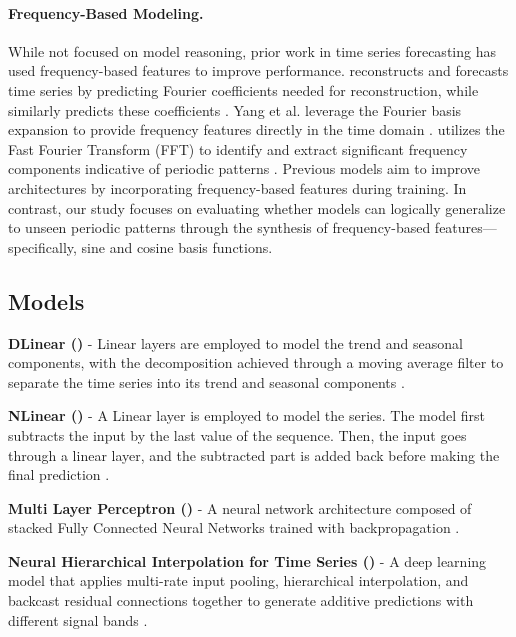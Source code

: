 \paragraph{Frequency-Based Modeling.} While not focused on model reasoning, prior work in time series forecasting has used frequency-based features to improve performance. \NBEATS reconstructs and forecasts time series by predicting Fourier coefficients needed for reconstruction, while \BasisFormer similarly predicts these coefficients \citep{ni2024basisformer}. Yang et al. leverage the Fourier basis expansion to provide frequency features directly in the time domain \citep{yang2024rethinkingfourier}. \TimesNet utilizes the Fast Fourier Transform (FFT) to identify and extract significant frequency components indicative of periodic patterns \citep{wu2023timesnettemporal2dvariationmodeling}. Previous models aim to improve architectures by incorporating frequency-based features during training. In contrast, our study focuses on evaluating whether models can logically generalize to unseen periodic patterns through the synthesis of frequency-based features—specifically, sine and cosine basis functions.

\subsection{Models}\label{apd:first_models}

\noindent\textbf{DLinear (\DLinear)} - Linear layers are employed to model the trend and seasonal components, with the decomposition achieved through a moving average filter to separate the time series into its trend and seasonal components \citep{zeng_2023_dlinear}. 

\noindent\textbf{NLinear (\NLinear)}  - A Linear layer is employed to model the series. The model first subtracts the input by the last value of the sequence. Then, the input goes through a linear layer, and the subtracted part is added back before making
the final prediction \citep{zeng_2023_dlinear}. 

\noindent\textbf{Multi Layer Perceptron (\MLP)} - A neural network architecture composed of stacked Fully Connected Neural Networks trained with backpropagation \citep{nair2010_mlp, fukushima1975_mlp, rosenblatt1958_mlp}. 

\noindent\textbf{Neural Hierarchical Interpolation for Time Series (\NHITS)} - A deep learning model that applies multi-rate input pooling, hierarchical interpolation, and backcast residual connections together to generate additive predictions with different signal bands \citep{challu_olivares2022_nhits}.

